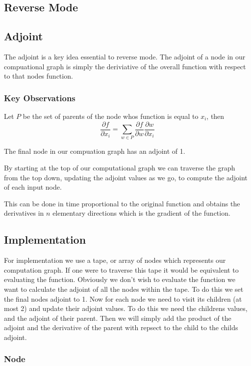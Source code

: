 \documentclass[a0,landscape]{a0poster}
\begin{document}
\begin{multicols}{4}
\section*{Reverse Mode}

\subsection*{Adjoint}
The adjoint is a key idea essential to reverse mode. 
The adjoint of a node in our compuational graph is simply the deriviative of the
overall function with respect to that nodes function.

\subsubsection*{Key Observations}
Let $P$ be the set of parents of the node whos function is equal to $x_i$, then
$$\frac{\partial f}{\partial x_i}=\sum_{w\in P}{\frac{\partial f}{\partial w}\frac{\partial w}{\partial x_i}}$$

The final node in our compuation graph has an adjoint of 1.

By starting at the top of our computational graph we can traverse the graph
from the top down, updating the adjoint values as we go, to compute the adjoint 
of each input node.

This can be done in time proportional to the original function and obtains the derivatives
in $n$ elementary directions which is the gradient of the function.

\subsection*{Implementation}
For implementation we use a tape, or array of nodes which represents our computation graph.
If one were to traverse this tape it would be equivalent to evaluating the function.
Obviously we don't wish to evaluate the function we want to calculate the adjoint of 
all the nodes within the tape. To do this we set the final nodes adjoint to 1.
Now for each node we need to visit its children (at most 2) and update their adjoint values.
To do this we need the childrens values, and the adjoint of their parent. Then we 
will simply add the product of the adjoint and the derivative of the parent with repsect to
the child to the childs adjoint.

\subsubsection*{Node}


\end{multicols}
\end{document}
